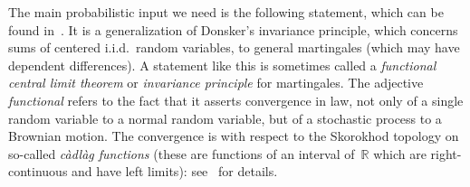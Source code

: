 \documentclass[11pt]{article} %
\numberwithin{equation}{section}
\theoremstyle{definition}
\newcommand*{\R}{\ensuremath{\mathbb{R}}}
\begin{document}
\smallskip

The main probabilistic input we need is the following statement, which can be found in~\cite[Theorem 3.2]{McLeish}. 
It is a generalization of Donsker's invariance principle, which concerns sums of centered i.i.d.~random variables, to general martingales (which may have dependent differences). 
A statement like this is sometimes called a \emph{functional central limit theorem} or \emph{invariance principle} for martingales. 
The adjective \emph{functional} refers to the fact that it asserts convergence in law, not only of a single random variable to a normal random variable, but of a stochastic process to a Brownian motion. The convergence is with respect to the Skorokhod topology on so-called \emph{c\`adl\`ag functions} (these are functions of an interval of~$\R$ which are right-continuous and have left limits):  see~\cite[Chapter VI]{JS} for details.  
\end{document}

